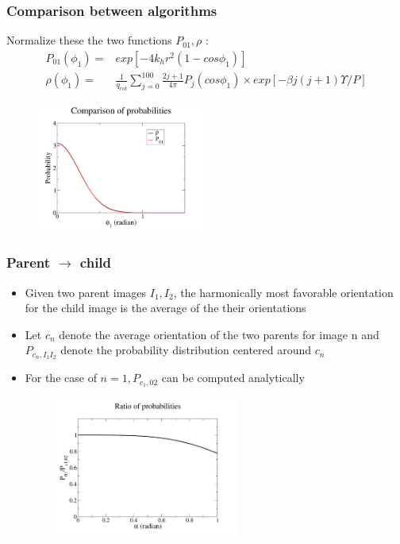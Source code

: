 \documentclass[xcolor=svgnames]{beamer}
\begin{document}
	\begin{frame}
	\frametitle{Comparison between algorithms}
	Normalize these the two functions $P_{01}, \rho$ :
	\begin{align*}
	P_{01} (\phi_1) = &exp [ -4 k_h r^2 (1 - cos \phi_1) ] \\
	\rho(\phi_1) = &\frac{1}{q_{rot}} \displaystyle\sum\limits_{j=0}^{100} \frac{2j+1}{4 \pi} P_j (cos \phi_1) \times exp[- \beta j (j+1)\Upsilon /P]
	\end{align*}
	\begin{center}
	\begin{figure}
	\includegraphics[width=5.5cm,keepaspectratio]{probabilityComparison.png}
	\end{figure}
	\end{center}
	\end{frame}

	\begin{frame}
	\frametitle{Parent $\to$ child}
	\begin{itemize}%
	\item Given two parent images $I_1,I_2$, the harmonically most favorable orientation for the child image is the average of the their orientations
	\item Let $c_n$ denote the average orientation of the two parents for image n and $P_{c_n,I_1 I_2}$ denote the probability distribution centered around $c_n$
	\item For the case of $n = 1, P_{c_1,02}$ can be computed analytically
	\begin{center}
	\begin{figure}
	\includegraphics[width=6cm,keepaspectratio]{yratio.png}
	\end{figure}
	\end{center}
	\end{itemize}
	\end{frame}
\end{document}

